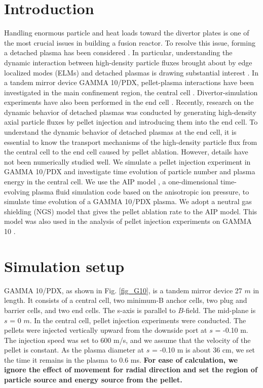 \documentclass{jasse}%
\begin{document}
\section{Introduction}
    Handling enormous particle and heat loads toward the divertor plates is one of the most crucial issues in building a fusion reactor. To resolve this issue, forming a detached plasma has been considered \cite{leonard18,ohno17}. In particular, understanding the dynamic interaction between high-density particle fluxes brought about by edge localized modes (ELMs) and detached plasmas is drawing substantial interest \cite{ohno17,loarte07}. In a tandem mirror device GAMMA 10/PDX, pellet-plasma interactions have been investigated in the main confinement region, the central cell \cite{kubota07,yoshikawa22,yoshikawa24}. Divertor-simulation experiments have also been performed in the end cell \cite{nakashima17,ezumi19}. Recently, research on the dynamic behavior of detached plasmas was conducted by generating high-density axial particle fluxes by pellet injection and introducing them into the end cell. To understand the dynamic behavior of detached plasmas at the end cell, it is essential to know the transport mechanisms of the high-density particle flux from the central cell to the end cell caused by pellet ablation. However, details have not been numerically studied well. We simulate a pellet injection experiment in GAMMA 10/PDX and investigate time evolution of particle number and plasma energy in the central cell. We use the AIP model \cite{togo22,togo19}, a one-dimensional time-evolving plasma fluid simulation code based on the anisotropic ion pressure, to simulate time evolution of a GAMMA 10/PDX plasma. We adopt a neutral gas shielding (NGS) model \cite{nakamura86} that gives the pellet ablation rate to the AIP model. This model was also used in the analysis of pellet injection experiments on GAMMA 10 \cite{kubota07}.


\section{Simulation setup}
    GAMMA 10/PDX, as shown in Fig. \ref{fig_G10}, is a tandem mirror device 27 $m$ in length. It consists of a central cell, two minimum-B anchor cells, two plug and barrier cells, and two end cells. The s-axis is parallel to $B$-field. The mid-plane is $s$ = 0 $m$. In the central cell, pellet injection experiments were conducted.
    The pellets were injected vertically upward from the downside port at $s$ = -0.10 m. The injection speed was set to 600 m/s, and we assume that the velocity of the pellet is constant. As the plasma diameter at  $s$ = -0.10 m is about 36 cm, we set the time it remains in the plasma to 0.6 ms. \textbf{For ease of calculation, we ignore the effect of movement for radial direction and set the region of particle source and energy source from the pellet.}
\end{document}
